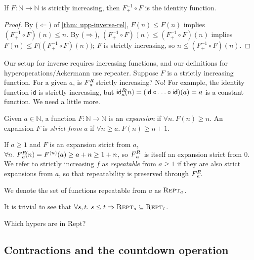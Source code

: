 \begin{col}
If $F:\mathbb{N}\to \mathbb{N}$ is strictly increasing, then $F^{-1}_{+} \circ F$ is
the identity function.
\end{col}
\begin{proof}
By ($\Leftarrow$) of \ref{thm: upp-inverse-rel}, $F(n) \le F(n)$ implies 
$(F^{-1}_{+} \circ F)(n) \le n$.  By ($\Rightarrow$), $(F^{-1}_{+} \circ F)(n) \le (F^{-1}_{+} \circ F)(n)$ implies $F(n) \le F \big((F^{-1}_{+} \circ F)(n)\big)$; $F$ is strictly increasing, so $n \le (F^{-1}_{+} \circ F)(n)$.
\end{proof}

Our setup for inverse requires increasing functions, and our definitions for 
hyperoperations/Ackermann use repeater.  Suppose $F$ is a strictly increasing function.
For a given $a$, is $\rf{F}{a}$ strictly increasing?  No!  For example, the identity function
$\mathsf{id}$ is strictly increasing, but $\rf{\mathsf{id}}{a}(n) = (\mathsf{id} \circ \ldots \circ \mathsf{id}) (a) = a$ is a constant function.  We need a little more.
\begin{defn}
Given $a\in \mathbb{N}$, a function $F:\mathbb{N}\to\mathbb{N}$ is an \emph{expansion} if $\forall n.~ F(n)\ge n$. An expansion $F$ is \emph{strict from} $a$ if $\forall n \ge a.~ F(n)\ge n+1$.
\end{defn}
If $a\ge 1$ and $F$ is an expansion strict from $a$, $\forall n.~ \rf{F}{a}(n) = F^{(n)}(a) \ge a + n \ge 1 + n$, so $\rf{F}{a} \ $ is itself an expansion strict from $0$. We refer to strictly increasing $f$ as \emph{repeatable} from $a\ge 1$ if they are also strict expansions from $a$, so that repeatability is preserved through $\rf{F}{a}$.
\begin{defn}
We denote the set of functions repeatable from $a$ as $\text{\scshape{Rept}}_a$.
\end{defn}
\begin{rem} \label{rem: repeatable-subset}
	It is trivial to see that $\forall s, t.~ s \le t \Rightarrow \text{\scshape{Rept}}_s \subseteq \text{\scshape{Rept}}_t $.
\end{rem}
{\color{red}
\begin{rem}
Which hypers are in Rept?
\end{rem}
}

\subsection{Contractions and the countdown operation}

